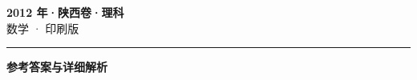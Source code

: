\documentclass[zihao=5, a4paper]{ctexart}
\begin{document}
\begin{center}
  {\Large\bfseries 2012 年·陕西卷·理科}\\[4pt]
  {\large 数学 · 印刷版}
\end{center}
\medskip
{}

\par\bigskip\hrule\bigskip
{}
\Needspace{0.55\textheight}
\begin{center}{\large\bfseries 参考答案与详细解析}\end{center}
\smallskip

\end{document}
